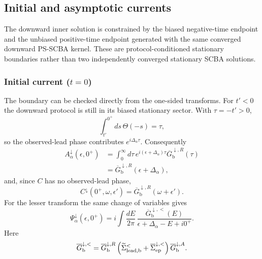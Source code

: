 \documentclass[
 reprint,
 superscriptaddress,
 amsmath,amssymb,
 aps,prb,
 longbibliography,
 floatfix
]{revtex4-2}
\newcommand{\ep}{\mathrm{ep}}
\newcommand{\barSigma}{\overline{\Sigma}}
\begin{document}
\subsection{Initial and asymptotic currents}
\label{sec:down-initial-asymptotic}

The downward inner solution is constrained by the biased negative-time endpoint and the unbiased positive-time endpoint generated with the same converged downward PS-SCBA kernel. These are protocol-conditioned stationary boundaries rather than two independently converged stationary SCBA solutions.

\subsubsection{Initial current ($t=0$)}

The boundary can be checked directly from the one-sided transforms. For $t'<0$ the downward protocol is still in its biased stationary sector. With $\tau=-t'>0$,
\begin{equation*}
\int_{t'}^{0^+}ds\,\Theta(-s)=\tau,
\end{equation*}
so the observed-lead phase contributes $e^{i\Delta_\alpha\tau}$. Consequently
\begin{equation}
\begin{aligned}
A_\alpha^\downarrow(\epsilon,0^+)
&=
\int_0^\infty d\tau\,
 e^{i(\epsilon+\Delta_\alpha)\tau}
 \overline G_{\mathrm b}^{\downarrow,R}(\tau)
\\
&=
\overline G_{\mathrm b}^{\downarrow,R}
(\epsilon+\Delta_\alpha),
\end{aligned}
\label{eq:down-t0-A-proof}
\end{equation}
and, since $C$ has no observed-lead phase,
\begin{equation}
C^\downarrow(0^+,\omega,\epsilon')
=
\overline G_{\mathrm b}^{\downarrow,R}
(\omega+\epsilon').
\label{eq:down-t0-C-proof}
\end{equation}
For the lesser transform the same change of variables gives
\begin{equation}
\Psi_\alpha^\downarrow(\epsilon,0^+)
=
 i\int\frac{dE}{2\pi}\,
\frac{\overline G_{\mathrm b}^{\downarrow,<}(E)}
{\epsilon+\Delta_\alpha-E+i0^+}.
\label{eq:down-t0-Psi-proof}
\end{equation}
Here
\begin{equation*}
\overline G_{\mathrm b}^{\downarrow,<}
=
\overline G_{\mathrm b}^{\downarrow,R}
\left(
\widetilde\Sigma_{\rm lead,b}^<
+
\barSigma_{\ep}^{\downarrow,<}
\right)
\overline G_{\mathrm b}^{\downarrow,A}.
\end{equation*}
\end{document}
